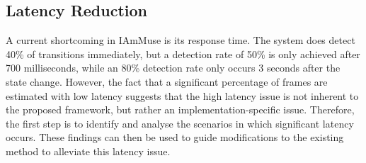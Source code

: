 \subsection*{Latency Reduction}
A current shortcoming in IAmMuse is its response time.
The system does detect 40\% of transitions immediately, but a detection rate of 50\% is only achieved after 700 milliseconds, while an 80\% detection rate only occurs 3 seconds after the state change.
However, the fact that a significant percentage of frames are estimated with low latency suggests that the high latency issue is not inherent to the proposed framework, but rather an implementation-specific issue.
Therefore, the first step is to identify and analyse the scenarios in which significant latency occurs.
These findings can then be used to guide modifications to the existing method to alleviate this latency issue.




